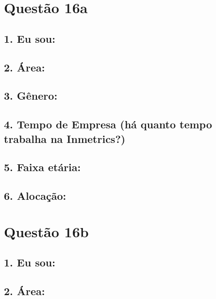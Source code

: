 \documentclass[]{book}
\begin{document}
\hypertarget{questao-16a}{%
\section{Questão 16a}\label{questao-16a}}

\hypertarget{eu-sou-29}{%
\subsection{1. Eu sou:}\label{eu-sou-29}}

\hypertarget{area-29}{%
\subsection{2. Área:}\label{area-29}}

\hypertarget{genero-29}{%
\subsection{3. Gênero:}\label{genero-29}}

\hypertarget{tempo-de-empresa-ha-quanto-tempo-trabalha-na-inmetrics-29}{%
\subsection{4. Tempo de Empresa (há quanto tempo trabalha na Inmetrics?)}\label{tempo-de-empresa-ha-quanto-tempo-trabalha-na-inmetrics-29}}

\hypertarget{faixa-etaria-29}{%
\subsection{5. Faixa etária:}\label{faixa-etaria-29}}

\hypertarget{alocacao-29}{%
\subsection{6. Alocação:}\label{alocacao-29}}

\hypertarget{questao-16b}{%
\section{Questão 16b}\label{questao-16b}}

\hypertarget{eu-sou-30}{%
\subsection{1. Eu sou:}\label{eu-sou-30}}

\hypertarget{area-30}{%
\subsection{2. Área:}\label{area-30}}
\end{document}
